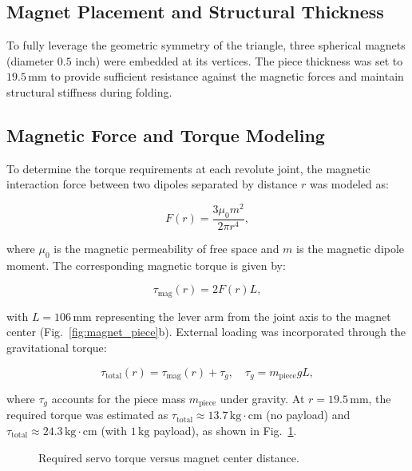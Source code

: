 \documentclass[lettersize,journal]{IEEEtran}
\begin{document}
\subsection{Magnet Placement and Structural Thickness}

To fully leverage the geometric symmetry of the triangle, three spherical magnets (diameter $0.5$ inch) were embedded at its vertices. The piece thickness was set to $19.5\,\mathrm{mm}$ to provide sufficient resistance against the magnetic forces and maintain structural stiffness during folding.


\subsection{Magnetic Force and Torque Modeling}

To determine the torque requirements at each revolute joint, the magnetic interaction force between two dipoles separated by distance $r$ was modeled as:

\begin{equation}
F(r) = \frac{3 \mu_0 m^2}{2 \pi r^4},
\label{eq:force}
\end{equation}

where $\mu_0$ is the magnetic permeability of free space and $m$ is the magnetic dipole moment. The corresponding magnetic torque is given by:

\begin{equation}
\tau_{\mathrm{mag}}(r) = 2 F(r) L,
\label{eq:mag_torque}
\end{equation}

with $L = 106\,\mathrm{mm}$ representing the lever arm from the joint axis to the magnet center (Fig.~\ref{fig:magnet_piece}b). External loading was incorporated through the gravitational torque:

\begin{equation}
\tau_{\mathrm{total}}(r) = \tau_{\mathrm{mag}}(r) + \tau_g, 
\quad \tau_g = m_{\text{piece}} g L,
\label{eq:total_torque}
\end{equation}

where $\tau_g$ accounts for the piece mass $m_{\text{piece}}$ under gravity. At $r = 19.5\,\mathrm{mm}$, the required torque was estimated as $\tau_{\mathrm{total}} \approx 13.7\,\mathrm{kg\cdot cm}$ (no payload) and $\tau_{\mathrm{total}} \approx 24.3\,\mathrm{kg\cdot cm}$ (with $1\,\mathrm{kg}$ payload), as shown in Fig.~\ref{fig:torque_vs_r}.

\begin{figure}
  \centering
  {\footnotesize
  \resizebox{0.9\linewidth}{!}{}
  }
  \caption{Required servo torque versus magnet center distance.}
  \label{fig:torque_vs_r}
\end{figure}
\end{document}
